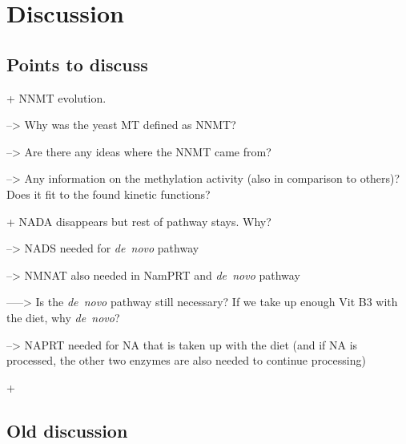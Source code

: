 
\section{Discussion}

\subsection{Points to discuss}

+ NNMT evolution.

--> Why was the yeast MT defined as NNMT?

--> Are there any ideas where the NNMT came from?

--> Any information on the methylation activity (also in comparison to others)? Does it fit to the found kinetic functions?

+ NADA disappears but rest of pathway stays. Why?

--> NADS needed for \textit{de~novo} pathway

--> NMNAT also needed in NamPRT and \textit{de~novo} pathway

-----> Is the \textit{de~novo} pathway still necessary? If we take up enough Vit B3 with the diet, why \textit{de~novo}?

--> NAPRT needed for NA that is taken up with the diet (and if NA is processed, the other two enzymes are also needed to continue processing)

+




\subsection{Old discussion}

